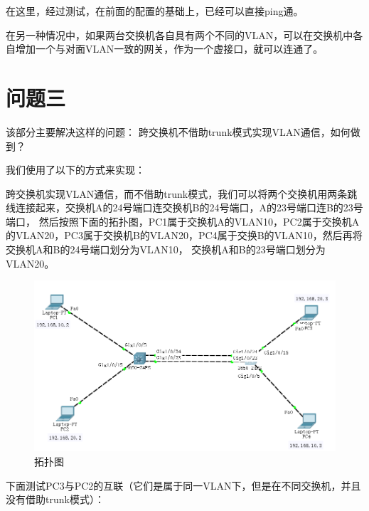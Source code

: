 \documentclass{myreport}
\begin{document}
在这里，经过测试，在前面的配置的基础上，已经可以直接ping通。

在另一种情况中，如果两台交换机各自具有两个不同的VLAN，可以在交换机中各自增加一个与对面VLAN一致的网关，作为一个虚接口，就可以连通了。




\chapter{问题三}

该部分主要解决这样的问题：
跨交换机不借助trunk模式实现VLAN通信，如何做到？

我们使用了以下的方式来实现：

跨交换机实现VLAN通信，而不借助trunk模式，我们可以将两个交换机用两条跳线连接起来，交换机A的24号端口连交换机B的24号端口，A的23号端口连B的23号端口，
然后按照下面的拓扑图，PC1属于交换机A的VLAN10，PC2属于交换机A的VLAN20，PC3属于交换机B的VLAN20，PC4属于交换B的VLAN10，然后再将交换机A和B的24号端口划分为VLAN10，
交换机A和B的23号端口划分为VLAN20。

\begin{figure}[htp]
    \centering
    \includegraphics[width=13cm]{"./figure/2018-05-18-02-58-05.png"}
    \caption{拓扑图}
    \label{fig:e3-topo}
\end{figure}


下面测试PC3与PC2的互联（它们是属于同一VLAN下，但是在不同交换机，并且没有借助trunk模式）：
\end{document}

